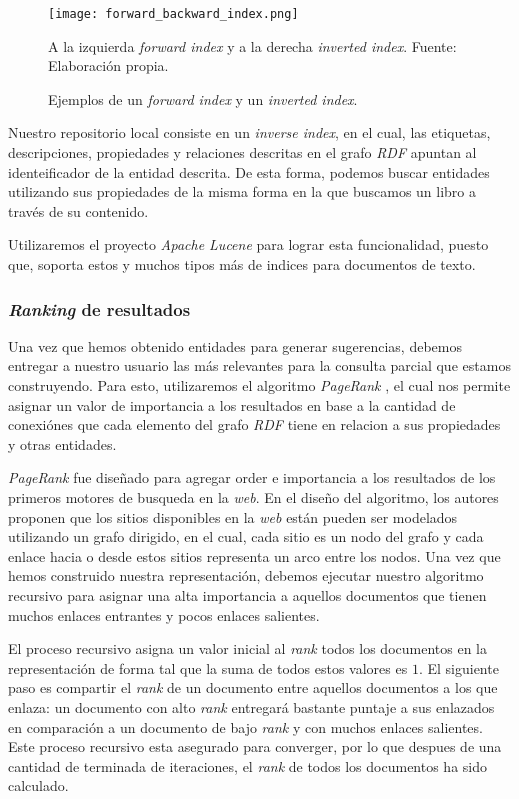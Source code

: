 \begin{figure}
    \centering
    \texttt{[image: forward\_backward\_index.png]}
    \caption{Ejemplos de un \textit{forward index} y un \textit{inverted
    index}.} A la izquierda \textit{forward index} y a la derecha
    \textit{inverted index}. Fuente: Elaboración propia.
    \label{fig:forward-backward-index}
\end{figure}

Nuestro repositorio local consiste en un \textit{inverse index}, en el cual, las
etiquetas, descripciones, propiedades y relaciones descritas en el grafo
\textit{RDF} apuntan al identeificador de la entidad descrita. De esta forma,
podemos buscar entidades utilizando sus propiedades de la misma forma en la que
buscamos un libro a través de su contenido.

Utilizaremos el proyecto \textit{Apache Lucene} \cite{apache2012welcome} para
lograr esta funcionalidad, puesto que, soporta estos y muchos tipos más de
indices para documentos de texto.

\subsubsection{\textit{Ranking} de resultados}

Una vez que hemos obtenido entidades para generar sugerencias, debemos entregar
a nuestro usuario las más relevantes para la consulta parcial que estamos
construyendo. Para esto, utilizaremos el algoritmo \textit{PageRank}
\cite{page1999pagerank}, el cual nos permite asignar un valor de importancia a
los resultados en base a la cantidad de conexiónes que cada elemento del grafo
\textit{RDF} tiene en relacion a sus propiedades y otras entidades.

\textit{PageRank} fue diseñado para agregar order e importancia a los resultados
de los primeros motores de busqueda en la \textit{web}. En el diseño del
algoritmo, los autores proponen que los sitios disponibles en la \textit{web}
están pueden ser modelados utilizando un grafo dirigido, en el cual, cada sitio
es un nodo del grafo y cada enlace hacia o desde estos sitios representa un arco
entre los nodos. Una vez que hemos construido nuestra representación, debemos
ejecutar nuestro algoritmo recursivo para asignar una alta importancia a
aquellos documentos que tienen muchos enlaces entrantes y pocos enlaces
salientes.

El proceso recursivo asigna un valor inicial al \textit{rank} todos los
documentos en la representación de forma tal que la suma de todos estos valores
es $1$. El siguiente paso es compartir el \textit{rank} de un documento entre
aquellos documentos a los que enlaza: un documento con alto \textit{rank}
entregará bastante puntaje a sus enlazados en comparación a un documento de bajo
\textit{rank} y con muchos enlaces salientes. Este proceso recursivo esta
asegurado para converger, por lo que despues de una cantidad de terminada de
iteraciones, el \textit{rank} de todos los documentos ha sido calculado.

